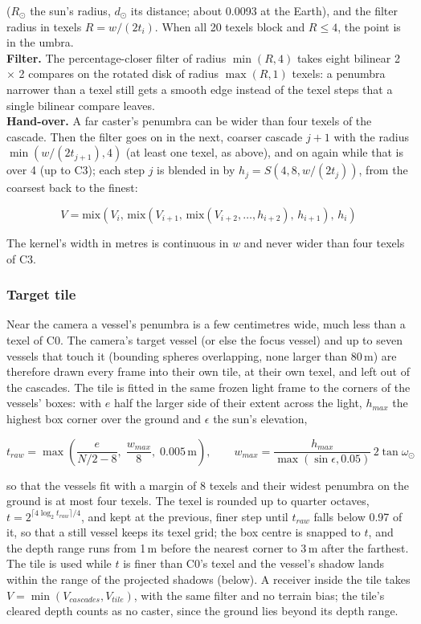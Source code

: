 \documentclass[Orbiter Technical Reference.tex]{subfiles}
\begin{document}
\begin{sloppypar}
\noindent
($R_{\odot}$ the sun's radius, $d_{\odot}$ its distance; about 0.0093 at the Earth), and the filter radius in texels $R = w/(2t_{i})$. When all 20 texels block and $R \le 4$, the point is in the umbra.\\
\textbf{Filter.} The percentage-closer filter of radius $\min(R, 4)$ takes eight bilinear 2 $\times$ 2 compares on the rotated disk of radius $\max(R, 1)$ texels: a penumbra narrower than a texel still gets a smooth edge instead of the texel steps that a single bilinear compare leaves.\\
\textbf{Hand-over.} A far caster's penumbra can be wider than four texels of the cascade. Then the filter goes on in the next, coarser cascade $j+1$ with the radius $\min(w/(2t_{j+1}), 4)$ (at least one texel, as above), and on again while that is over 4 (up to C3); each step $j$ is blended in by $h_{j} = S(4, 8, w/(2t_{j}))$, from the coarsest back to the finest:

\[ V = \mathrm{mix}\left(V_{i},\, \mathrm{mix}(V_{i+1},\, \mathrm{mix}(V_{i+2}, \ldots, h_{i+2}),\, h_{i+1}),\, h_{i}\right) \]

\noindent
The kernel's width in metres is continuous in $w$ and never wider than four texels of C3.

\subsubsection{Target tile}
Near the camera a vessel's penumbra is a few centimetres wide, much less than a texel of C0. The camera's target vessel (or else the focus vessel) and up to seven vessels that touch it (bounding spheres overlapping, none larger than 80\,m) are therefore drawn every frame into their own tile, at their own texel, and left out of the cascades. The tile is fitted in the same frozen light frame to the corners of the vessels' boxes: with $e$ half the larger side of their extent across the light, $h_{max}$ the highest box corner over the ground and $\epsilon$ the sun's elevation,

\[ t_{raw} = \max\left(\frac{e}{N/2 - 8},\; \frac{w_{max}}{8},\; 0.005\,\mathrm{m}\right), \qquad w_{max} = \frac{h_{max}}{\max(\sin\epsilon, 0.05)}\,2\tan\omega_{\odot} \]

\noindent
so that the vessels fit with a margin of 8 texels and their widest penumbra on the ground is at most four texels. The texel is rounded up to quarter octaves, $t = 2^{\lceil 4\log_{2}t_{raw}\rceil/4}$, and kept at the previous, finer step until $t_{raw}$ falls below 0.97 of it, so that a still vessel keeps its texel grid; the box centre is snapped to $t$, and the depth range runs from 1\,m before the nearest corner to 3\,m after the farthest. The tile is used while $t$ is finer than C0's texel and the vessel's shadow lands within the range of the projected shadows (below). A receiver inside the tile takes $V = \min(V_{cascades}, V_{tile})$, with the same filter and no terrain bias; the tile's cleared depth counts as no caster, since the ground lies beyond its depth range.


\end{sloppypar}
\end{document}
